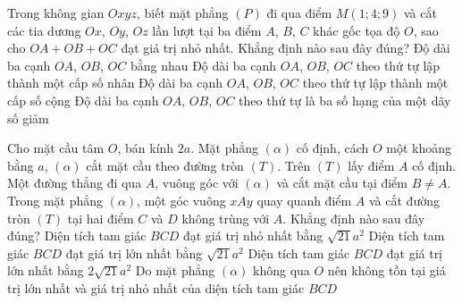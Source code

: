 \begin{ex}%
	Trong không gian $Oxyz$, biết mặt phẳng $(P)$ đi qua điểm $M(1; 4; 9)$ và cắt các tia dương $Ox$, $Oy$, $Oz$ lần lượt tại ba điểm $A$, $B$, $C$ khác gốc tọa độ $O$, sao cho $OA+OB+OC$ đạt giá trị nhỏ nhất. Khẳng định nào sau đây đúng?
	\choice
	{Độ dài ba cạnh $OA$, $OB$, $OC$ bằng nhau}
	{Độ dài ba cạnh $OA$, $OB$, $OC$ theo thứ tự lập thành một cấp số nhân}
	{\True Độ dài ba cạnh $OA$, $OB$, $OC$ theo thứ tự lập thành một cấp số cộng}
	{Độ dài ba cạnh $OA$, $OB$, $OC$ theo thứ tự là ba số hạng của một dãy số giảm}
\end{ex}

\begin{ex}%
	Cho mặt cầu tâm $O$, bán kính $2a$. Mặt phẳng $(\alpha)$ cố định, cách $O$ một khoảng bằng $a$, $(\alpha)$ cắt mặt cầu theo đường tròn $(T)$. Trên $(T)$ lấy điểm $A$ cố định. Một đường thẳng đi qua $A$, vuông góc với $(\alpha)$ và cắt mặt cầu tại điểm $B\neq A$. Trong mặt phẳng $(\alpha)$, một góc vuông $xAy$ quay quanh điểm $A$ và cắt đường tròn $(T)$ tại hai điểm $C$ và $D$ không trùng với $A$. Khẳng định nào sau đây đúng?
	\choice
	{Diện tích tam giác $BCD$ đạt giá trị nhỏ nhất bằng $\sqrt{21}a^2$}
	{\True Diện tích tam giác $BCD$ đạt giá trị lớn nhất bằng $\sqrt{21}a^2$}
	{Diện tích tam giác $BCD$ đạt giá trị lớn nhất bằng $2\sqrt{21}a^2$}
	{Do mặt phẳng $(\alpha)$ không qua $O$ nên không tồn tại giá trị lớn nhất và giá trị nhỏ nhất của diện tích tam giác $BCD$}
\end{ex}

